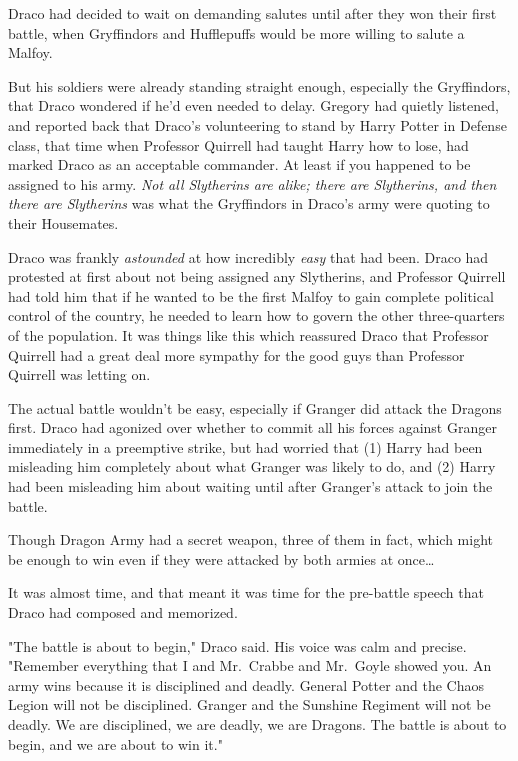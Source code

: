 Draco had decided to wait on demanding salutes until after they won their first
battle, when Gryffindors and Hufflepuffs would be more willing to salute a
Malfoy.

But his soldiers were already standing straight enough, especially the
Gryffindors, that Draco wondered if he'd even needed to delay. Gregory had
quietly listened, and reported back that Draco's volunteering to stand by Harry
Potter in Defense class, that time when Professor Quirrell had taught Harry how
to lose, had marked Draco as an acceptable commander. At least if you happened
to be assigned to his army. \emph{Not all Slytherins are alike; there are
Slytherins, and then there are Slytherins} was what the Gryffindors in Draco's
army were quoting to their Housemates.

Draco was frankly \emph{astounded} at how incredibly \emph{easy} that had been.
Draco had protested at first about not being assigned any Slytherins, and
Professor Quirrell had told him that if he wanted to be the first Malfoy to
gain complete political control of the country, he needed to learn how to
govern the other three-quarters of the population. It was things like this
which reassured Draco that Professor Quirrell had a great deal more sympathy
for the good guys than Professor Quirrell was letting on.

The actual battle wouldn't be easy, especially if Granger did attack the
Dragons first. Draco had agonized over whether to commit all his forces against
Granger immediately in a preemptive strike, but had worried that (1) Harry had
been misleading him completely about what Granger was likely to do, and (2)
Harry had been misleading him about waiting until after Granger's attack to
join the battle.

Though Dragon Army had a secret weapon, three of them in fact, which might be
enough to win even if they were attacked by both armies at once{\ldots}

It was almost time, and that meant it was time for the pre-battle speech that
Draco had composed and memorized.

"The battle is about to begin," Draco said. His voice was calm and precise.
"Remember everything that I and Mr.~Crabbe and Mr.~Goyle showed you. An army
wins because it is disciplined and deadly. General Potter and the Chaos Legion
will not be disciplined. Granger and the Sunshine Regiment will not be deadly.
We are disciplined, we are deadly, we are Dragons. The battle is about to
begin, and we are about to win it."
\sbreak
\vspace{-2\baselineskip}
